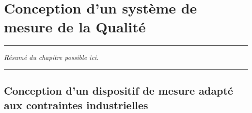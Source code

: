 
\lhead[\fancyplain{}{\leftmark}]%
      {\fancyplain{}{}} %
\chead[\fancyplain{}{}]%
      {\fancyplain{}{}}
\rhead[\fancyplain{}{}]%
      {\fancyplain{}{\rightmark}}%
\lfoot[\fancyplain{}{}]%
      {\fancyplain{}{}}
\cfoot[\fancyplain{}{\thepage}]%
      {\fancyplain{}{\thepage}} %
\rfoot[\fancyplain{}{}]%
     {\fancyplain{}{\scriptsize}}



\chapter{Conception d'un système de mesure de la Qualité }
\label{ch:theeye}


\begin{center}
\rule{0.7\linewidth}{.5pt}
\begin{minipage}{0.7\linewidth}
\smallskip

\textit{Résumé du chapitre possible ici.
}

\end{minipage}
\smallskip
\rule{0.7\linewidth}{.5pt}
\end{center}

\minitoc
\newpage

\begin{raggedright}
\section{Conception d'un dispositif de mesure adapté aux contraintes industrielles}
\end{raggedright}

